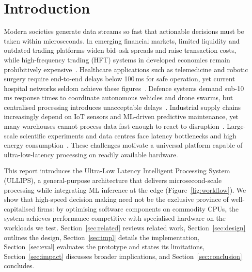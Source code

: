 \documentclass[10pt,a4paper,twocolumn]{article}
\begin{document}
\section{Introduction}
Modern societies generate data streams so fast that actionable decisions must be taken
within microseconds. In emerging financial markets, limited liquidity and outdated trading
platforms widen bid--ask spreads and raise transaction costs, while high-frequency trading
(HFT) systems in developed economies remain prohibitively expensive~\cite{ssga,investopedia}.
Healthcare applications such as telemedicine and robotic surgery require end-to-end delays
below 100\,ms for safe operation, yet current hospital networks seldom achieve these
figures~\cite{fiveg}. Defence systems demand sub-10\,ms response times to coordinate
autonomous vehicles and drone swarms, but centralised processing introduces unacceptable
delays~\cite{ceragon}. Industrial supply chains increasingly depend on IoT sensors and
ML-driven predictive maintenance, yet many warehouses cannot process data fast enough to
react to disruption~\cite{iotforall}. Large-scale scientific experiments and data centres
face latency bottlenecks and high energy consumption~\cite{ornl,deloitte}. These challenges
motivate a universal platform capable of ultra-low-latency processing on readily available
hardware.

This report introduces the Ultra-Low Latency Intelligent Processing System (ULLIPS), a
general-purpose architecture that delivers microsecond-scale processing while integrating
ML inference at the edge (Figure~\ref{fig:workflow}). We show that high-speed decision
making need not be the exclusive province of well-capitalised firms: by optimising software
components on commodity CPUs, the system achieves performance competitive with specialised
hardware on the workloads we test. Section~\ref{sec:related} reviews related work,
Section~\ref{sec:design} outlines the design, Section~\ref{sec:impl} details the
implementation, Section~\ref{sec:eval} evaluates the prototype and states its limitations,
Section~\ref{sec:impact} discusses broader implications, and Section~\ref{sec:conclusion}
concludes.
\end{document}

